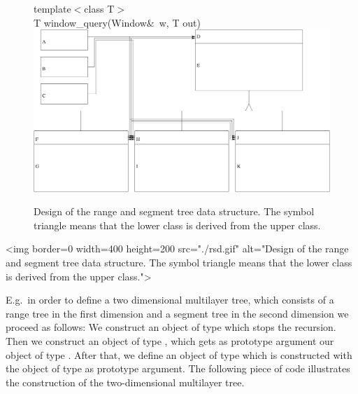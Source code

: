 \begin{ccTexOnly}
\begin{figure}
{{template$<$class T$>$\\
\hspace*{.2cm} T window\_query(Window$\&$~w, T out){}}}
\includegraphics[width=\textwidth,clip]{SearchStructures/rangesegmentdesign}
\caption{\label{rangesegmentdesign} Design of the range and
  segment tree data structure. The symbol triangle means
that the lower class is derived from the upper class. }
\end{figure}
\end{ccTexOnly}

\begin{ccHtmlOnly}
    <img border=0 width=400 height=200 src="./rsd.gif" alt="Design of the range and
  segment tree data structure. The symbol triangle means
that the lower class is derived from the upper class.">
\end{ccHtmlOnly}

E.g.\ in order to define a two dimensional multilayer tree, which
consists of a range tree  in the first dimension and a segment
tree in the second dimension we proceed as follows: We construct
an object of type  which stops the
recursion. Then we construct an object of type ,
which gets as prototype argument our object of type
. After that, we define an object of type
 which is constructed with the object of type
 as prototype argument.
The following piece of code illustrates
the construction of the two-dimensional multilayer tree.

